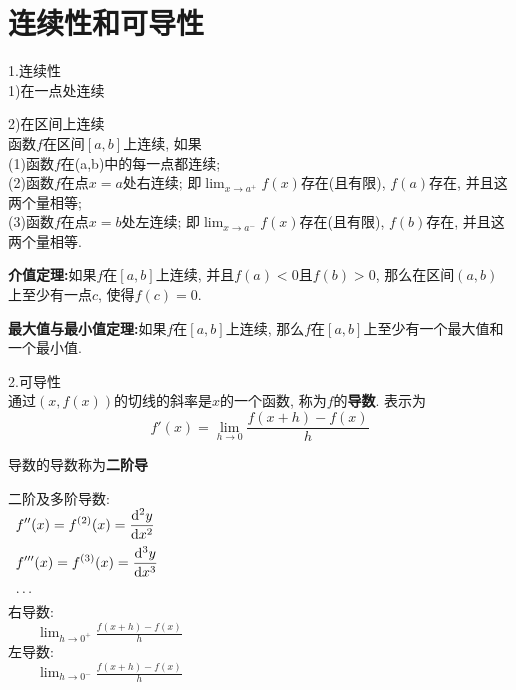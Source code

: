 \chapter{连续性和可导性}
1.连续性\\
1)在一点处连续
\begin{center}
\end{center}\vspace{6ex}

2)在区间上连续\\
函数$f$在区间$[a,b]$上连续, 如果\\
(1)函数$f$在(a,b)中的每一点都连续;\\
(2)函数$f$在点$x=a$处右连续; 即$\displaystyle\lim_{x\to a^+}f(x)$存在(且有限), $f(a)$存在, 并且这两个量相等;\\
(3)函数$f$在点$x=b$处左连续; 即$\displaystyle\lim_{x\to a^-}f(x)$存在(且有限), $f(b)$存在, 并且这两个量相等.\\[2ex]

\begin{boxedminipage}{12cm}
	\textbf{介值定理:}如果$f$在$[a,b]$上连续, 并且$f(a)<0$且$f(b)>0$, 那么在区间$(a,b)$上至少有一点$c$, 使得$f(c)=0$.
\end{boxedminipage}\vspace{4ex}

\begin{boxedminipage}{12cm}
	\textbf{最大值与最小值定理:}如果$f$在$[a,b]$上连续, 那么$f$在$[a,b]$上至少有一个最大值和一个最小值.
\end{boxedminipage}\vspace{6ex}

2.可导性\\
通过$(x,f(x))$的切线的斜率是$x$的一个函数, 称为$f$的\textbf{导数}. 表示为
\[f'(x)=\lim_{h\to 0}\frac{f(x+h)-f(x)}{h}\]

导数的导数称为\textbf{二阶导}

二阶及多阶导数:\\
\begin{math}
\begin{array}{l}
	\displaystyle f''(x)=f^{(2)}(x)=\frac{\mathop{}\!\mathrm{d}^2y}{\mathop{}\!\mathrm{d} x^2}\\[2ex]
	\displaystyle f'''(x)=f^{(3)}(x)=\frac{\mathop{}\!\mathrm{d}^3y}{\mathop{}\!\mathrm{d} x^3}\\[2ex]
	\cdots
\end{array}
\end{math}\\[2ex]

右导数:\\
$\displaystyle\phantom{\qquad}\lim_{h\to 0^+}\frac{f(x+h)-f(x)}{h}$\\

左导数:\\
$\displaystyle\phantom{\qquad}\lim_{h\to 0^-}\frac{f(x+h)-f(x)}{h}$\vspace{6ex}

\begin{center}
\end{center}

